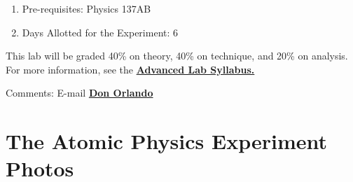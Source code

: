 \documentclass{../lab}
\begin{document}
\begin{enumerate}
    \item Pre-requisites: Physics 137AB

    \item Days Allotted for the Experiment: 6

\end{enumerate}

This lab will be graded 40\% on theory, 40\% on technique, and 20\% on analysis. For more information, see the \href{\AdvancedLabSyllabus}{\textbf{Advanced Lab Syllabus.}}

Comments: E-mail \href{\MailDonOrlando}{\textbf{Don Orlando}}

\pagebreak

\section{The Atomic Physics Experiment Photos}
\end{document}
